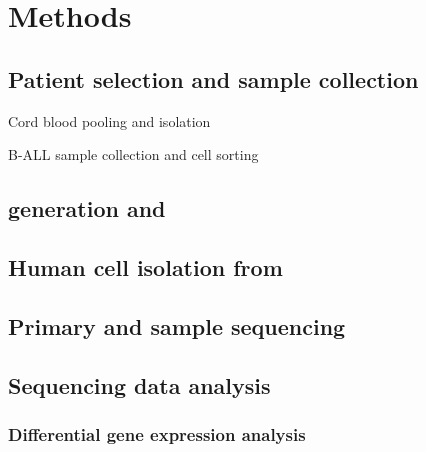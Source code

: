 \section{Methods}

\subsection{Patient selection and sample collection}

Cord blood pooling and isolation

B-ALL sample collection and cell sorting

\subsection{ generation and }

\subsection{Human cell isolation from }

\subsection{Primary and  sample sequencing}

\subsubsection{}

\subsubsection{}

\subsubsection{}

\subsection{Sequencing data analysis}

\subsubsection{Differential gene expression analysis}

